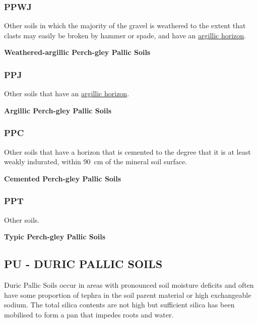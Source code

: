 \documentclass[
  letterpaper,
  DIV=11,
  numbers=noendperiod]{scrreprt}
\begin{document}
\hypertarget{sec-key-PPWJ}{%
\subsubsection{\texorpdfstring{\textbf{PPWJ}}{PPWJ}}\label{sec-key-PPWJ}}

Other soils in which the majority of the gravel is weathered to the
extent that clasts may easily be broken by hammer or spade, and have an
\protect\hyperlink{sec-diag-argh}{argillic horizon}.

\textbf{Weathered-argillic Perch-gley Pallic Soils}

\hypertarget{sec-key-PPJ}{%
\subsubsection{\texorpdfstring{\textbf{PPJ}}{PPJ}}\label{sec-key-PPJ}}

Other soils that have an \protect\hyperlink{sec-diag-argh}{argillic
horizon}.

\textbf{Argillic Perch-gley Pallic Soils}

\hypertarget{sec-key-PPC}{%
\subsubsection{\texorpdfstring{\textbf{PPC}}{PPC}}\label{sec-key-PPC}}

Other soils that have a horizon that is cemented to the degree that it
is at least weakly indurated, within 90~cm of the mineral soil surface.

\textbf{Cemented Perch-gley Pallic Soils}

\hypertarget{sec-key-PPT}{%
\subsubsection{\texorpdfstring{\textbf{PPT}}{PPT}}\label{sec-key-PPT}}

Other soils.

\textbf{Typic Perch-gley Pallic Soils}

\hypertarget{sec-PU}{%
\subsection{\texorpdfstring{\textbf{PU} - DURIC PALLIC
SOILS}{PU - DURIC PALLIC SOILS}}\label{sec-PU}}

Duric Pallic Soils occur in areas with pronounced soil moisture deficits
and often have some proportion of tephra in the soil parent material or
high exchangeable sodium. The total silica contents are not high but
sufficient silica has been mobilised to form a pan that impedes roots
and water.
\end{document}
